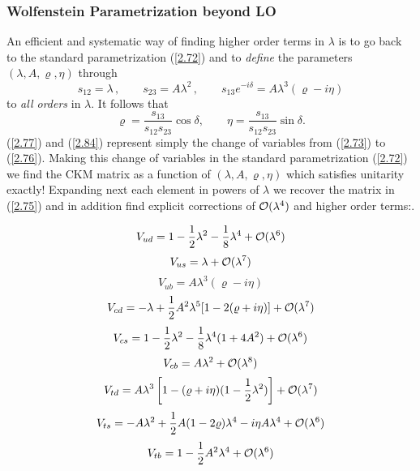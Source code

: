 \documentclass[12pt]{article}
\newcommand{\be}{\begin{equation}}
\newcommand{\ee}{\end{equation}}
\newcommand{\ord}{{\cal O}}
\begin{document}
\begin{itemize}
\subsubsection{Wolfenstein Parametrization beyond LO}
An efficient and systematic way of finding higher order terms in $\lambda$
is to go back to the standard parametrization (\ref{2.72}) and to
 {\it define} the parameters $(\lambda,A,\varrho,\eta)$ through 
\cite{BLO,schubert}
\begin{equation}\label{2.77} 
s_{12}=\lambda\,,
\qquad
s_{23}=A \lambda^2\,,
\qquad
s_{13} e^{-i\delta}=A \lambda^3 (\varrho-i \eta)
\end{equation}
to {\it  all orders} in $\lambda$. 
It follows  that
\begin{equation}\label{2.84} 
\varrho=\frac{s_{13}}{s_{12}s_{23}}\cos\delta,
\qquad
\eta=\frac{s_{13}}{s_{12}s_{23}}\sin\delta.
\end{equation}
(\ref{2.77}) and (\ref{2.84}) represent simply
the change of variables from (\ref{2.73}) to (\ref{2.76}).
Making this change of variables in the standard parametrization 
(\ref{2.72}) we find the CKM matrix as a function of 
$(\lambda,A,\varrho,\eta)$ which satisfies unitarity exactly!
Expanding next each element in powers of $\lambda$ we recover the
matrix in (\ref{2.75}) and in addition find explicit corrections of
$\ord(\lambda^4)$ and higher order terms:. 

\be
V_{ud}=1-\frac{1}{2}\lambda^2-\frac{1}{8}\lambda^4 +\ord(\lambda^6)
\ee
\be
V_{us}=\lambda+\ord(\lambda^7)
\ee
\be
V_{ub}=A \lambda^3 (\varrho-i \eta)
\ee
\be
V_{cd}=-\lambda+\frac{1}{2} A^2\lambda^5 [1-2 (\varrho+i \eta)]+
\ord(\lambda^7)
\ee
\be
V_{cs}= 1-\frac{1}{2}\lambda^2-\frac{1}{8}\lambda^4(1+4 A^2) +\ord(\lambda^6)
\ee
\be
V_{cb}=A\lambda^2+\ord(\lambda^8)
\ee
\be
V_{td}=A\lambda^3 \left[ 1-(\varrho+i \eta)(1-\frac{1}{2}\lambda^2)\right]
+\ord (\lambda^7)
\ee
\begin{equation}\label{2.83d}
 V_{ts}= -A\lambda^2+\frac{1}{2}A(1-2 \varrho)\lambda^4
-i\eta A \lambda^4 +\ord(\lambda^6)
\end{equation}
\be
V_{tb}=1-\frac{1}{2} A^2\lambda^4+\ord(\lambda^6)
\ee


\end{itemize}
\end{document}
